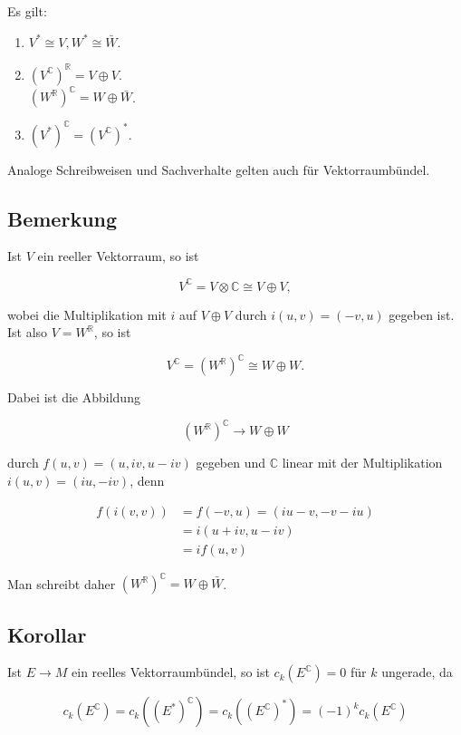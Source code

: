\documentclass[10pt, letterpaper]{article}
\begin{document}
Es gilt:

\begin{enumerate}
  \item $V^{*} \cong V, W^{*} \cong \bar{W}$.
  \item $\left(V^{\mathbb{C}}\right)^{\mathbb{R}}=V \oplus V$.\\
$\left(W^{\mathbb{R}}\right)^{\mathbb{C}}=W \oplus \bar{W}$.
  \item $\left(V^{*}\right)^{\mathbb{C}}=\left(V^{\mathbb{C}}\right)^{*}$.
\end{enumerate}

Analoge Schreibweisen und Sachverhalte gelten auch für Vektorraumbündel.

\subsection*{Bemerkung}
Ist $V$ ein reeller Vektorraum, so ist

$$
V^{\mathbb{C}}=V \otimes \mathbb{C} \cong V \oplus V,
$$

wobei die Multiplikation mit $i$ auf $V \oplus V$ durch $i(u, v)=(-v, u)$ gegeben ist. Ist also $V=W^{\mathbb{R}}$, so ist

$$
V^{\mathbb{C}}=\left(W^{\mathbb{R}}\right)^{\mathbb{C}} \cong W \oplus W .
$$

Dabei ist die Abbildung

$$
\left(W^{\mathbb{R}}\right)^{\mathbb{C}} \rightarrow W \oplus W
$$

durch $f(u, v)=(u, i v, u-i v)$ gegeben und $\mathbb{C}$ linear mit der Multiplikation $i(u, v)=(i u,-i v)$, denn

$$
\begin{aligned}
f(i(v, v)) & =f(-v, u)=(i u-v,-v-i u) \\
& =i(u+i v, u-i v) \\
& =i f(u, v)
\end{aligned}
$$

Man schreibt daher $\left(W^{\mathbb{R}}\right)^{\mathbb{C}}=W \oplus \bar{W}$.

\subsection*{Korollar}
Ist $E \rightarrow M$ ein reelles Vektorraumbündel, so ist $c_{k}\left(E^{\mathbb{C}}\right)=0$ für $k$ ungerade, da

$$
c_{k}\left(E^{\mathbb{C}}\right)=c_{k}\left(\left(E^{*}\right)^{\mathbb{C}}\right)=c_{k}\left(\left(E^{\mathbb{C}}\right)^{*}\right)=(-1)^{k} c_{k}\left(E^{\mathbb{C}}\right)
$$
\end{document}
